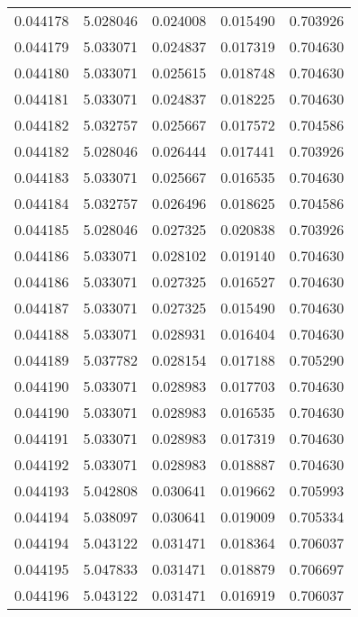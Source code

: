 \begin{tabular}{lrrrr}
0.044178    &  5.028046 &  0.024008 &  0.015490 &             0.703926 \\
0.044179    &  5.033071 &  0.024837 &  0.017319 &             0.704630 \\
0.044180    &  5.033071 &  0.025615 &  0.018748 &             0.704630 \\
0.044181    &  5.033071 &  0.024837 &  0.018225 &             0.704630 \\
0.044182    &  5.032757 &  0.025667 &  0.017572 &             0.704586 \\
0.044182    &  5.028046 &  0.026444 &  0.017441 &             0.703926 \\
0.044183    &  5.033071 &  0.025667 &  0.016535 &             0.704630 \\
0.044184    &  5.032757 &  0.026496 &  0.018625 &             0.704586 \\
0.044185    &  5.028046 &  0.027325 &  0.020838 &             0.703926 \\
0.044186    &  5.033071 &  0.028102 &  0.019140 &             0.704630 \\
0.044186    &  5.033071 &  0.027325 &  0.016527 &             0.704630 \\
0.044187    &  5.033071 &  0.027325 &  0.015490 &             0.704630 \\
0.044188    &  5.033071 &  0.028931 &  0.016404 &             0.704630 \\
0.044189    &  5.037782 &  0.028154 &  0.017188 &             0.705290 \\
0.044190    &  5.033071 &  0.028983 &  0.017703 &             0.704630 \\
0.044190    &  5.033071 &  0.028983 &  0.016535 &             0.704630 \\
0.044191    &  5.033071 &  0.028983 &  0.017319 &             0.704630 \\
0.044192    &  5.033071 &  0.028983 &  0.018887 &             0.704630 \\
0.044193    &  5.042808 &  0.030641 &  0.019662 &             0.705993 \\
0.044194    &  5.038097 &  0.030641 &  0.019009 &             0.705334 \\
0.044194    &  5.043122 &  0.031471 &  0.018364 &             0.706037 \\
0.044195    &  5.047833 &  0.031471 &  0.018879 &             0.706697 \\
0.044196    &  5.043122 &  0.031471 &  0.016919 &             0.706037 \\

\end{tabular}
